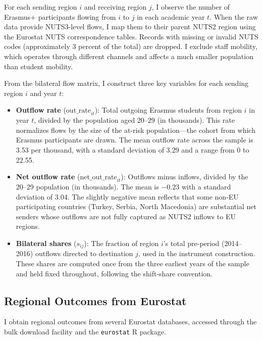\documentclass[12pt]{article}
\begin{document}
For each sending region $i$ and receiving region $j$, I observe the number of Erasmus+ participants flowing from $i$ to $j$ in each academic year $t$. When the raw data provide NUTS3-level flows, I map them to their parent NUTS2 region using the Eurostat NUTS correspondence tables. Records with missing or invalid NUTS codes (approximately 3 percent of the total) are dropped. I exclude staff mobility, which operates through different channels and affects a much smaller population than student mobility.

From the bilateral flow matrix, I construct three key variables for each sending region $i$ and year $t$:

\begin{itemize}
    \item \textbf{Outflow rate} ($\text{out\_rate}_{it}$): Total outgoing Erasmus students from region $i$ in year $t$, divided by the population aged 20--29 (in thousands). This rate normalizes flows by the size of the at-risk population---the cohort from which Erasmus participants are drawn. The mean outflow rate across the sample is 3.53 per thousand, with a standard deviation of 3.29 and a range from 0 to 22.55.
    \item \textbf{Net outflow rate} ($\text{net\_out\_rate}_{it}$): Outflows minus inflows, divided by the 20--29 population (in thousands). The mean is $-0.23$ with a standard deviation of 3.04. The slightly negative mean reflects that some non-EU participating countries (Turkey, Serbia, North Macedonia) are substantial net senders whose outflows are not fully captured as NUTS2 inflows to EU regions.
    \item \textbf{Bilateral shares} ($s_{ij}$): The fraction of region $i$'s total pre-period (2014--2016) outflows directed to destination $j$, used in the instrument construction. These shares are computed once from the three earliest years of the sample and held fixed throughout, following the shift-share convention.
\end{itemize}

\subsection{Regional Outcomes from Eurostat}

I obtain regional outcomes from several Eurostat databases, accessed through the bulk download facility and the \texttt{eurostat} R package.
\end{document}
